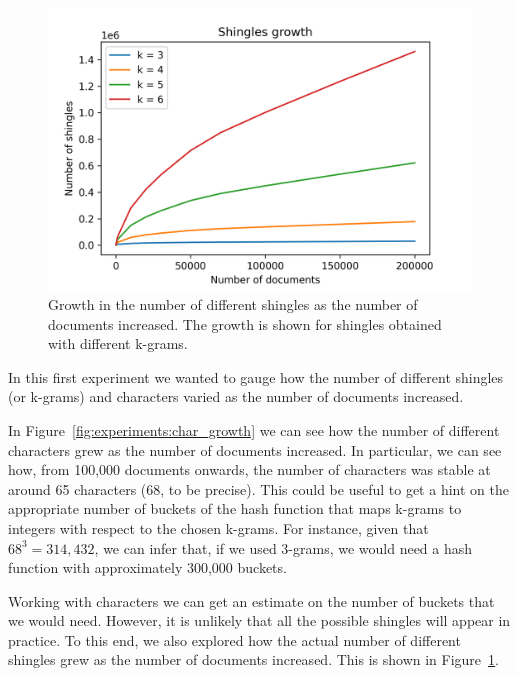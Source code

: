 \documentclass[runningheads]{llncs}
\begin{document}
\begin{figure}
  \center
  \includegraphics[width=1\textwidth]{../img/shingles_growth.png}
  \caption{Growth in the number of different shingles as the number of documents increased. The growth is shown for shingles obtained with different k-grams.} 
  \label{fig:experiments:shingles_growth}
\end{figure}

In this first experiment we wanted to gauge how the number of different shingles (or k-grams) and characters varied as the number of documents increased.

In Figure~\ref{fig:experiments:char_growth} we can see how the number of different characters grew as the number of documents increased. In particular, we can see how, from 100,000 documents onwards, the number of characters was stable at around 65 characters (68, to be precise). This could be useful to get a hint on the appropriate number of buckets of the hash function that maps k-grams to integers with respect to the chosen k-grams. For instance, given that $68^3 = 314,432$, we can infer that, if we used 3-grams, we would need a hash function with approximately 300,000 buckets.

Working with characters we can get an estimate on the number of buckets that we would need. However, it is unlikely that all the possible shingles will appear in practice. To this end, we also explored how the actual number of different shingles grew as the number of documents increased. This is shown in Figure~\ref{fig:experiments:shingles_growth}. 
\end{document}
